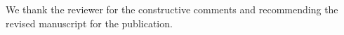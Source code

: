 
\vspace{0.1in}
We thank the reviewer for the constructive comments and recommending the revised manuscript for the publication. 
